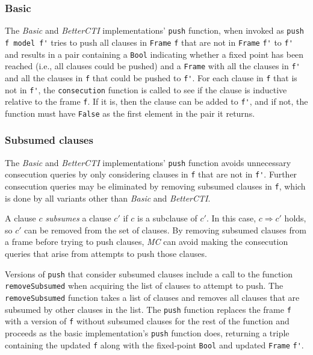 \documentclass[12pt,a4paper,twoside,openright]{report}
\begin{document}
{{\subsubsection{Basic}
The {\it Basic} and {\it BetterCTI} implementations' \verb,push, function,
when invoked as \verb,push f model f', tries to push all clauses in \verb,Frame, \verb,f,
that are not in \verb,Frame, \verb,f', to \verb,f', and
results in a pair containing a \verb,Bool, indicating whether a fixed point has been reached
(i.e., all clauses could be pushed) and a \verb,Frame, with all the clauses in \verb,f', and all
the clauses in \verb,f, that could be pushed to \verb,f',.
For each clause in \verb,f, that is not in \verb,f',, the \verb,consecution, function is called to
see if the clause is inductive relative to the frame \verb,f,. If it is, then
the clause can be added to \verb,f',, and if not, the
function must have \verb,False, as the first element in the pair it returns.

\subsubsection{Subsumed clauses}
The \emph{Basic} and \emph{BetterCTI} implementations' \verb,push, function avoids unnecessary
consecution queries by only considering clauses in \verb,f, that are not in \verb,f',.
Further consecution queries may be eliminated by removing subsumed clauses in \verb,f,,
which is done by all variants other than {\it Basic}
and \emph{BetterCTI}.

A clause $c$ \emph{subsumes} a clause $c'$ if $c$ is a subclause of
$c'$. In this case, $c \Rightarrow c'$ holds, so $c'$ can be removed from the set of clauses. By
removing subsumed clauses from a frame before trying to push clauses, \emph{MC}
can avoid making the consecution queries that arise from attempts to push those clauses.

Versions of \verb,push, that consider subsumed clauses include a call to the function
\verb,removeSubsumed, when acquiring the list of clauses to attempt to push.
The \verb,removeSubsumed, function takes a list of clauses and removes all clauses that are
subsumed by other clauses in the list.
The \verb,push, function replaces the frame
\verb,f, with a version of \verb,f, without subsumed clauses
for the rest of the function and proceeds as the basic implementation's \verb,push, function does,
returning a triple containing the updated \verb,f, along with the fixed-point \verb,Bool,
and updated \verb,Frame, \verb,f',.

}}
\end{document}
